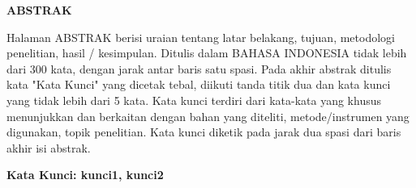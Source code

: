\clearpage
{}%
\thispagestyle{fancy}

\begin{center}
	\large \bfseries \MakeUppercase{Abstrak}\\
	\bigskip

	\normalsize \normalfont \justifying \singlespacing
	Halaman ABSTRAK berisi uraian tentang latar belakang, tujuan, metodologi penelitian, hasil / kesimpulan. Ditulis dalam BAHASA INDONESIA tidak lebih dari 300 kata, dengan jarak antar baris satu spasi. Pada akhir abstrak ditulis kata "Kata Kunci" yang dicetak tebal, diikuti tanda titik dua dan kata kunci yang tidak lebih dari 5 kata. Kata kunci terdiri dari kata-kata yang khusus menunjukkan dan berkaitan dengan bahan yang diteliti, metode/instrumen yang digunakan, topik penelitian. Kata kunci diketik pada jarak dua spasi dari baris akhir isi abstrak.\par

    \vspace{20pt}
	\raggedright \textbf{Kata Kunci: kunci1, kunci2}

	\vfill

\end{center}
\clearpage
